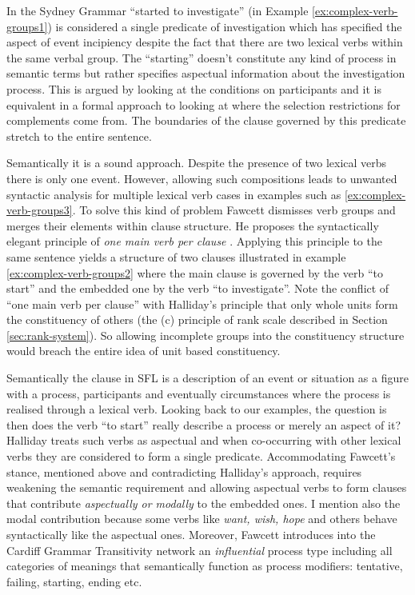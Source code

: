     In the Sydney Grammar ``started to investigate'' (in Example \ref{ex:complex-verb-groups1}) is considered a single predicate of investigation which has specified the aspect of event incipiency despite the fact that there are two lexical verbs within the same verbal group. The ``starting'' doesn't constitute any kind of process in semantic terms but rather specifies aspectual information about the investigation process. This is argued by looking at the conditions on participants and it is equivalent in a formal approach to looking at where the selection restrictions for complements come from. The boundaries of the clause governed by this predicate stretch to the entire sentence.
    
    Semantically it is a sound approach. Despite the presence of two lexical verbs there is only one event. However, allowing such compositions leads to unwanted syntactic analysis for multiple lexical verb cases in examples such as \ref{ex:complex-verb-groups3}. To solve this kind of problem Fawcett dismisses verb groups and merges their elements within clause structure. He proposes the syntactically elegant principle of \textit{one main verb per clause} \citep{Fawcett2008}. Applying this principle to the same sentence yields a structure of two clauses illustrated in example \ref{ex:complex-verb-groups2} where the main clause is governed by the verb ``to start'' and the embedded one by the verb ``to investigate''. Note the conflict of ``one main verb per clause'' with Halliday's principle that only whole units form the constituency of others (the (c) principle of rank scale described in Section \ref{sec:rank-system}). So allowing incomplete groups into the constituency structure would breach the entire idea of unit based constituency. 
    
    Semantically the clause in SFL is a description of an event or situation as a figure with a process, participants and eventually circumstances where the process is realised through a lexical verb. Looking back to our examples, the question is then does the verb ``to start'' really describe a process or merely an aspect of it? Halliday treats such verbs as aspectual and when co-occurring with other lexical verbs they are considered to form a single predicate. Accommodating Fawcett's stance, mentioned above and contradicting Halliday's approach, requires weakening the semantic requirement and allowing aspectual verbs to form clauses that contribute \textit{aspectually or modally} to the embedded ones. I mention also the modal contribution because some verbs like \textit{want, wish, hope} and others behave syntactically like the aspectual ones. Moreover, Fawcett introduces into the Cardiff Grammar Transitivity network an \textit{influential} process type including all categories of meanings that semantically function as process modifiers: tentative, failing, starting, ending etc.
    
